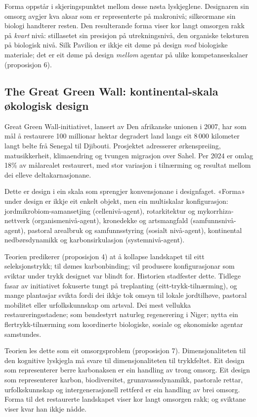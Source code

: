\noindent Forma oppstår i skjeringspunktet mellom desse nøsta lyskjeglene. Designaren sin omsorg avgjer kva aksar som er representerte på makronivå; silkeormane sin biologi handterer resten. Den resulterande forma viser kor langt omsorgen rakk på \textit{kvart} nivå: stillasetet sin presisjon på utrekningsnivå, den organiske teksturen på biologisk nivå. Silk Pavilion er ikkje eit døme på design \textit{med} biologiske materiale; det er eit døme på design \textit{mellom} agentar på ulike kompetanseskalaer (proposisjon 6).

\subsection{The Great Green Wall: kontinental-skala økologisk design}

Great Green Wall-initiativet, lansert av Den afrikanske unionen i 2007, har som mål å restaurere 100 millionar hektar degradert land langs eit 8\,000 kilometer langt belte frå Senegal til Djibouti. Prosjektet adresserer ørkenspreiing, matusikkerheit, klimaendring og tvungen migrasjon over Sahel. Per 2024 er omlag 18\% av målarealet restaurert, med stor variasjon i tilnærming og resultat mellom dei elleve deltakarnasjonane.

Dette er design i ein skala som sprengjer konvensjonane i designfaget. «Forma» under design er ikkje eit enkelt objekt, men ein multiskalar konfigurasjon: jordmikrobiom-samansetjing (cellenivå-agent), rotarkitektur og mykorrhiza-nettverk (organismenivå-agent), kronedekke og artsmangfald (samfunnsnivå-agent), pastoral arealbruk og samfunnsstyring (sosialt nivå-agent), kontinental nedbørsdynamikk og karbonsirkulasjon (systemnivå-agent).

Teorien predikerer (proposisjon 4) at å kollapse landskapet til eitt seleksjonstrykk; til dømes karbonbinding; vil produsere konfigurasjonar som sviktar under trykk designet var blindt for. Historien stadfester dette. Tidlege fasar av initiativet fokuserte tungt på treplanting (eitt-trykk-tilnærming), og mange plantasjar svikta fordi dei ikkje tok omsyn til lokale jordtilhøve, pastoral mobilitet eller urfolkskunnskap om artsval. Dei mest vellukka restaureringsstadene; som bøndestyrt naturleg regenerering i Niger; nytta ein flertrykk-tilnærming som koordinerte biologiske, sosiale og økonomiske agentar samstundes.

Teorien les dette som eit omsorgsproblem (proposisjon 7). Dimensjonaliteten til den kognitive lyskjegla må svare til dimensjonaliteten til trykkfeltet. Eit design som representerer berre karbonaksen er ein handling av trong omsorg. Eit design som representerer karbon, biodiversitet, grunnvasssdynamikk, pastorale rettar, urfolkskunnskap og intergenerasjonell rettferd er ein handling av brei omsorg. Forma til det restaurerte landskapet viser kor langt omsorgen rakk; og sviktane viser kvar han ikkje nådde.

